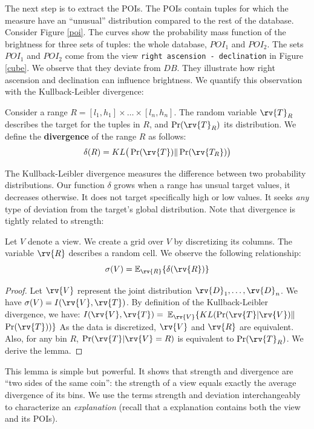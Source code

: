 The next step is to extract the POIs. The POIs contain tuples for which the
measure have an ``unusual'' distribution compared to the rest of the database.
Consider Figure \ref{poi}. The curves show the probability mass function of the
brightness for three sets of tuples: the whole database, $POI_1$ and $POI_2$.
The sets $POI_1$ and $POI_2$ come from the view \texttt{right ascension -
declination} in Figure \ref{cube}. We observe that they deviate from $DB$.
They illustrate how right ascension and declination can influence brightness.
We quantify this observation with the Kullback-Leibler divergence:

\begin{definition}
Consider a range $R = [l_1, h_1] \times \ldots \times [l_n, h_n]$. 
The random variable $\rv{T}_R$ describes the target for
the tuples in $R$, and $\Pr(\rv{T}_R)$ its distribution.
We define the \textbf{divergence} of the range $R$ as follows: 
\[\delta(R) = KL \big( \Pr(\rv{T}) \| \Pr(\rv{T_R})  \big)\]
\end{definition}

The Kullback-Leibler divergence measures the difference between two probability
distributions. Our function $\delta$ grows when a range has unsual target
values, it decreases otherwise. It does not target specifically high or low
values. It seeks \emph{any} type of deviation from the target's global
distribution.  Note that divergence is tightly related to strength:

\begin{lemma}
Let $V$ denote a view. We create a grid over $V$ by discretizing its
columns. The variable $\rv{R}$ describes a random cell.  We observe the
following relationship:
\[
    \sigma(V) = \mathbb{E}_{\rv{R}} \{ \delta(\rv{R}) \}
\]
\end{lemma}

\begin{proof}
Let $\rv{V}$ represent the joint distribution $\rv{D}_1, \ldots, \rv{D}_n$.
We have $\sigma(V) = I(\rv{V},\rv{T})$.
By definition of the Kullback-Leibler divergence, we have: 
$I(\rv{V},\rv{T}) = $ $\mathbb{E}_{\rv{V}} \{ KL( \Pr(\rv{T} | \rv{V}) \|$ $ \Pr(\rv{T}) ) \}$
As the data is discretized, $\rv{V}$ and $\rv{R}$ are equivalent. Also,
for any bin $R$, $\Pr(\rv{T} | \rv{V} = R)$ is equivalent to
$\Pr(\rv{T}_R)$. We derive the lemma.
\end{proof}


This lemma is simple but powerful. It shows that strength and divergence are
``two sides of the same coin'': the strength of a view equals exactly the
average divergence of its bins. We use the terms strength and
deviation interchangeably to characterize an \emph{explanation} (recall that a
explanation contains both the view and its POIs).

